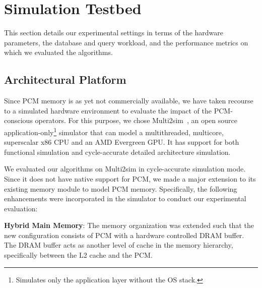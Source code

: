 \begin{comment}
\begin{figure*}[ht]
\sbox{\measurebox}{
\begin{minipage}[b]{.33\textwidth}
\subfloat[Q13]{\usebox{\firstlisting}}
\hfill%
\subfloat[Q16]{\usebox{\secondlisting}}  
\end{minipage}
}
\usebox{\measurebox}\qquad
\hspace{4em}
\begin{minipage}[b][\ht\measurebox][s]{.33\textwidth}
\subfloat[Q19]{\usebox{\thirdlisting}} 
\end{minipage}
\caption{ Queries}
\label{fig:queries}
\end{figure*}


\end{comment}

\section{Simulation Testbed}
This section details our experimental settings in terms of the hardware
parameters, the database and query workload, and the performance metrics
on which we evaluated the algorithms.

\label{sec:exp}


\subsection{Architectural Platform}
Since PCM memory is as yet not commercially available, we
have taken recourse to a simulated hardware environment to
evaluate the impact of the PCM-conscious operators.  For this
purpose, we chose Multi2sim~\cite{multi2sim}, an open source
application-only\footnote{Simulates only the application layer without
the OS stack.} simulator that can model a multithreaded, multicore,
superscalar x86 CPU and an AMD Evergreen GPU. It has support for both
functional simulation and cycle-accurate detailed architecture simulation.

We evaluated our algorithms on Multi2sim in cycle-accurate simulation
mode. Since it does not have native support for PCM, we made a major
extension to its existing memory module to model PCM memory. Specifically,
the following enhancements were incorporated in the simulator to conduct
our experimental evaluation:

\textbf{Hybrid Main Memory}: 
The memory organization was extended such that the new configuration
consists of PCM with a hardware controlled DRAM buffer. The DRAM buffer
acts as another level of cache in the memory hierarchy, specifically
between the L2 cache and the PCM.

